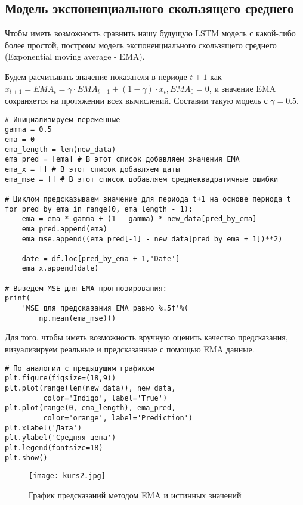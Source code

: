 \documentclass[12pt, a4paper]{article}
\begin{document}
\subsection{Модель экспоненциального скользящего среднего}

Чтобы иметь возможность сравнить нашу будущую LSTM модель с какой-либо более простой, построим модель экспоненциального скользящего среднего (Exponential moving average - EMA).

Будем расчитывать значение показателя в периоде $t+1$ как $x_{t+1} = EMA_t = \gamma \cdot EMA_{t-1} + (1 - \gamma) \cdot x_t, EMA_0 = 0$, и значение EMA сохраняется на протяжении всех вычислений. Составим такую модель с $\gamma = 0.5$.

\begin{verbatim}
# Инициализируем переменные
gamma = 0.5
ema = 0
ema_length = len(new_data)
ema_pred = [ema] # В этот список добавляем значения EMA
ema_x = [] # В этот список добавляем даты
ema_mse = [] # В этот список добавляем среднеквадратичные ошибки

# Циклом предсказываем значение для периода t+1 на основе периода t
for pred_by_ema in range(0, ema_length - 1):
    ema = ema * gamma + (1 - gamma) * new_data[pred_by_ema]
    ema_pred.append(ema)
    ema_mse.append((ema_pred[-1] - new_data[pred_by_ema + 1])**2)

    date = df.loc[pred_by_ema + 1,'Date']
    ema_x.append(date)

# Выведем MSE для EMA-прогнозирования:
print(
    'MSE для предсказания EMA равно %.5f'%(
        np.mean(ema_mse)))
\end{verbatim}

Для того, чтобы иметь возможность вручную оценить качество предсказания, визуализируем реальные и предсказанные с помощью EMA данные.

\begin{verbatim}
# По аналогии с предыдущим графиком
plt.figure(figsize=(18,9))
plt.plot(range(len(new_data)), new_data,
         color='Indigo', label='True')
plt.plot(range(0, ema_length), ema_pred,
         color='orange', label='Prediction')
plt.xlabel('Дата')
plt.ylabel('Средняя цена')
plt.legend(fontsize=18)
plt.show()
\end{verbatim}

\begin{figure}[h]
    \centering
    \texttt{[image: kurs2.jpg]}
		\caption{График предсказаний методом EMA и истинных значений}
\end{figure}
\end{document}
